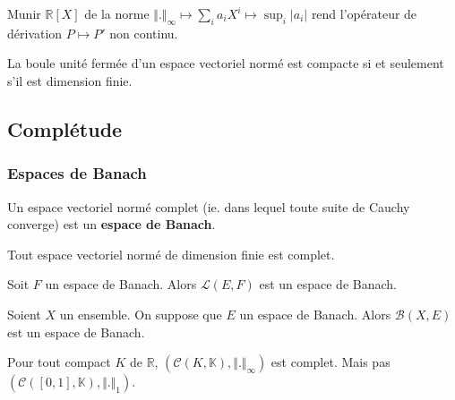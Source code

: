 	\begin{cexample}
		Munir $\mathbb{R}[X]$ de la norme $\Vert . \Vert_\infty \mapsto \sum_{i} a_i X^i \mapsto \sup_i \vert a_i \vert$ rend l'opérateur de dérivation $P \mapsto P'$ non continu.
	\end{cexample}


	\begin{theorem}[Riesz]
		La boule unité fermée d'un espace vectoriel normé est compacte si et seulement s'il est dimension finie.
	\end{theorem}

	\subsection{Complétude}

	\subsubsection{Espaces de Banach}


	\begin{definition}
		Un espace vectoriel normé complet (ie. dans lequel toute suite de Cauchy converge) est un \textbf{espace de Banach}.
	\end{definition}


	\begin{example}
		Tout espace vectoriel normé de dimension finie est complet.
	\end{example}

	\begin{example}
		Soit $F$ un espace de Banach. Alors $\mathcal{L}(E,F)$ est un espace de Banach.
	\end{example}


	\begin{example}
		Soient $X$ un ensemble. On suppose que $E$ un espace de Banach. Alors $\mathcal{B}(X,E)$ est un espace de Banach.
	\end{example}


	\begin{example}
		Pour tout compact $K$ de $\mathbb{R}$, $(\mathcal{C}(K, \mathbb{K}), \Vert . \Vert_\infty)$ est complet. Mais pas $(\mathcal{C}([0,1], \mathbb{K}), \Vert . \Vert_1)$.
	\end{example}

